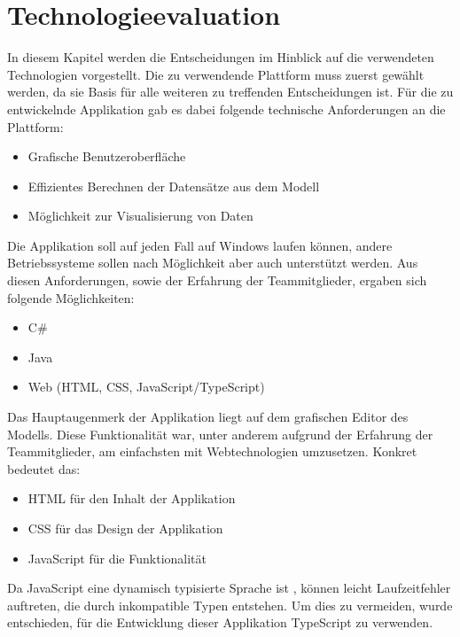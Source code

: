
\chapter{Technologieevaluation}

In diesem Kapitel werden die Entscheidungen im Hinblick auf die verwendeten Technologien vorgestellt. Die zu verwendende Plattform muss zuerst gewählt werden, da sie Basis für alle weiteren zu treffenden Entscheidungen ist. Für die zu entwickelnde Applikation gab es dabei folgende technische Anforderungen an die Plattform:

\begin{itemize}
    \item Grafische Benutzeroberfläche
    \item Effizientes Berechnen der Datensätze aus dem Modell
    \item Möglichkeit zur Visualisierung von Daten
\end{itemize}

Die Applikation soll auf jeden Fall auf Windows laufen können, andere Betriebssysteme sollen nach Möglichkeit aber auch unterstützt werden. Aus diesen Anforderungen, sowie der Erfahrung der Teammitglieder, ergaben sich folgende Möglichkeiten:
\begin{itemize}
    \item C\#
    \item Java
    \item Web (HTML, CSS, JavaScript/TypeScript)
\end{itemize}

Das Hauptaugenmerk der Applikation liegt auf dem grafischen Editor des Modells. Diese Funktionalität war, unter anderem aufgrund der Erfahrung der Teammitglieder, am einfachsten mit Webtechnologien umzusetzen. Konkret bedeutet das:
\begin{itemize}
    \item HTML für den Inhalt der Applikation
    \item CSS für das Design der Applikation
    \item JavaScript für die Funktionalität
\end{itemize}

Da JavaScript eine dynamisch typisierte Sprache ist \cite{mdn:javascript}, können leicht Laufzeitfehler auftreten, die durch inkompatible Typen entstehen. Um dies zu vermeiden, wurde entschieden, für die Entwicklung dieser Applikation TypeScript zu verwenden.

